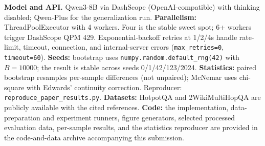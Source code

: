 \documentclass[11pt]{article}
\begin{document}
\textbf{Model and API.} Qwen3-8B via DashScope (OpenAI-compatible) with thinking disabled; Qwen-Plus for the generalization run. \textbf{Parallelism:} ThreadPoolExecutor with 4 workers. Four is the stable sweet spot; 6+ workers trigger DashScope QPM 429. Exponential-backoff retries at 1/2/4s handle rate-limit, timeout, connection, and internal-server errors (\texttt{max\_retries=0}, \texttt{timeout=60}). \textbf{Seeds:} bootstrap uses \texttt{numpy.random.default\_rng(42)} with $B=10000$; the result is stable across seeds 0/1/42/123/2024. \textbf{Statistics:} paired bootstrap resamples per-sample differences (not unpaired); McNemar uses chi-square with Edwards' continuity correction. Reproducer: \texttt{reproduce\_paper\_results.py}. \textbf{Datasets:} HotpotQA and 2WikiMultiHopQA are publicly available with the cited references. \textbf{Code:} the implementation, data-preparation and experiment runners, figure generators, selected processed evaluation data, per-sample results, and the statistics reproducer are provided in the code-and-data archive accompanying this submission.
\end{document}
